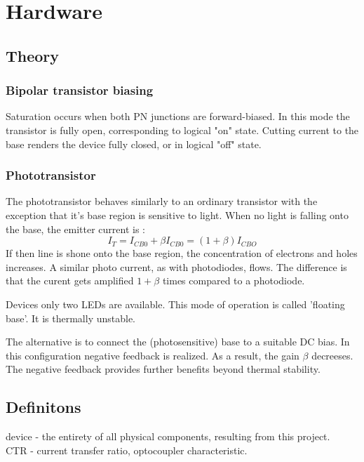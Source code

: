 \section{Hardware}
\subsection{Theory}

\subsubsection{Bipolar transistor biasing}
Saturation occurs when both PN junctions are forward-biased.
In this mode the transistor is fully open, corresponding to logical "on" state.
Cutting current to the base renders the device fully closed, or in logical "off" state.

\subsubsection{Phototransistor}
The phototransistor behaves similarly to an ordinary transistor with the exception that it's base region is sensitive to light.
When no light is falling onto the base, the emitter current is \cite[p. 418] {shishkov}:
\begin{equation}
    I_T = I_{CB0} + \beta I_{CB0} = (1 + \beta) I_{CBO}
\end{equation}
If then line is shone onto the base region, the concentration of electrons and holes increases.
A similar photo current, as with photodiodes, flows.
The difference is that the curent gets amplified $1+\beta$ times compared to a photodiode.
\par
Devices only two LEDs are available.
This mode of operation is called 'floating base'.
It is thermally unstable.
\par
The alternative is to connect the (photosensitive) base to a suitable DC bias.
In this configuration negative feedback is realized.
As a result, the gain $\beta$ decreeses.
The negative feedback provides further benefits beyond thermal stability.

\subsection{Definitons}
device - the entirety of all physical components, resulting from this project.  \\
CTR - current transfer ratio, optocoupler characteristic.

